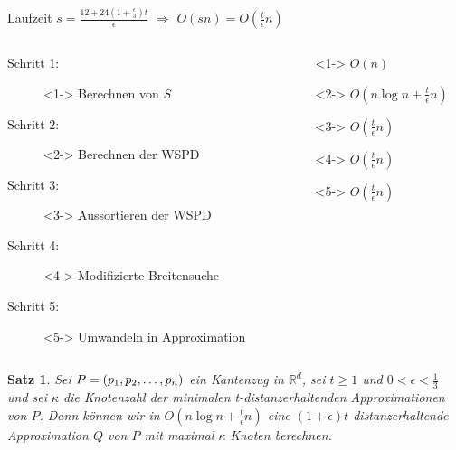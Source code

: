 \documentclass{beamer}
\newtheorem{thm}{Satz}
\begin{document}
	\begin{frame}{Laufzeit}
		\centering
		$s = \frac{12 + 24(1 + \frac{\epsilon}{3})t}{\epsilon}$ $\Rightarrow$ $O(sn) = O(\frac{t}{\epsilon}n)$
		\begin{columns}
			\begin{column}{0.6\textwidth}
				\begin{description}
					\item[Schritt 1:]<1-> Berechnen von $S$
					\item[Schritt 2:]<2-> Berechnen der WSPD
					\item[Schritt 3:]<3-> Aussortieren der WSPD
					\item[Schritt 4:]<4-> Modifizierte Breitensuche
					\item[Schritt 5:]<5-> Umwandeln in Approximation
				\end{description}
			\end{column}
			\begin{column}{0.6\textwidth}
				\begin{description}
					\item[]<1-> $O(n)$
					\item[]<2-> $O(n \log n + \frac{t}{\epsilon}n)$
					\item[]<3-> $O(\frac{t}{\epsilon}n)$
					\item[]<4-> $O(\frac{t}{\epsilon}n)$
					\item[]<5-> $O(\frac{t}{\epsilon}n)$
				\end{description}
			\end{column}
		\end{columns}
	\end{frame}
	
	\begin{frame}
		\begin{thm}
		   	Sei $P = (p_1, p_2, \mathellipsis, p_n)$ ein Kantenzug in $\mathbb{R}^d$, sei $t \geq 1$ und $0 < \epsilon < \frac{1}{3}$ und sei $\kappa$ die Knotenzahl der minimalen t-distanzerhaltenden Approximationen von $P$. Dann können wir in $O(n \log n + \frac{t}{\epsilon}n)$ eine $(1 + \epsilon)t$-distanzerhaltende Approximation $Q$ von $P$ mit maximal $\kappa$ Knoten berechnen.
		\end{thm}
	\end{frame}
\end{document}
